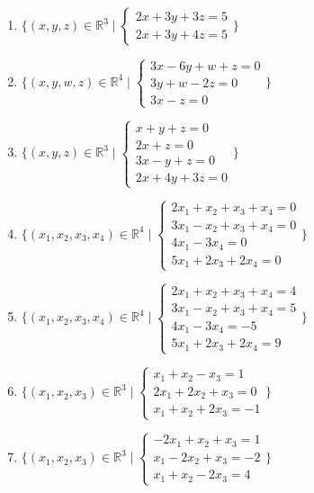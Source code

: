 \documentclass[11pt,a4paper]{article}
\begin{document}
\begin{enumerate}
\item $\displaystyle \{(x, y, z) \in \mathbb{R}^{3} \mid \begin{cases} 2x + 3y + 3z = 5 \\ 2x + 3y + 4z = 5 \end{cases}\}$
\item $\displaystyle \{(x, y, w, z) \in \mathbb{R}^{4} \mid \begin{cases} 3x - 6y + w + z = 0 \\ 3y + w - 2z = 0 \\ 3x - z = 0 \end{cases}\}$
\item $\displaystyle \{(x, y, z) \in \mathbb{R}^{3} \mid \begin{cases} x + y + z = 0 \\ 2x + z = 0 \\ 3x - y + z = 0 \\ 2x + 4y + 3z = 0 \end{cases}\}$
\item $\displaystyle \{(x_{1}, x_{2}, x_{3}, x_{4}) \in \mathbb{R}^{4} \mid \begin{cases} 2x_{1} + x_{2} + x_{3} + x_{4} = 0 \\ 3x_{1} - x_{2} + x_{3} + x_{4} = 0 \\ 4x_{1} - 3x_{4} = 0 \\ 5x_{1} + 2x_{3} + 2x_{4} = 0 \end{cases}\}$
\item $\displaystyle \{(x_{1}, x_{2}, x_{3}, x_{4}) \in \mathbb{R}^{4} \mid \begin{cases} 2x_{1} + x_{2} + x_{3} + x_{4} = 4 \\ 3x_{1} - x_{2} + x_{3} + x_{4} = 5 \\ 4x_{1} - 3x_{4} = -5 \\ 5x_{1} + 2x_{3} + 2x_{4} = 9 \end{cases}\}$
\item $\displaystyle \{(x_{1}, x_{2}, x_{3}) \in \mathbb{R}^{3} \mid \begin{cases} x_{1} + x_{2} - x_{3} = 1 \\ 2x_{1} + 2x_{2} + x_{3} = 0 \\ x_{1} + x_{2} + 2x_{3} = -1 \end{cases}\}$
\item $\displaystyle \{(x_{1}, x_{2}, x_{3}) \in \mathbb{R}^{3} \mid \begin{cases} -2x_{1} + x_{2} + x_{3} = 1 \\ x_{1} - 2x_{2} + x_{3} = -2 \\ x_{1} + x_{2} - 2x_{3} = 4 \end{cases}\}$

\end{enumerate}
\end{document}
